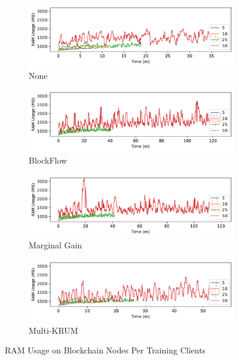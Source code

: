 \begin{figure}[!ht]
    \centering
    \begin{subfigure}[b]{0.49\textwidth}
        \centering
        \includegraphics[width=\textwidth]{graphics/clients/ram_none_miner.pdf}
        \caption{None}
    \end{subfigure}
    \hfill
    \begin{subfigure}[b]{0.49\textwidth}
        \centering
        \includegraphics[width=\textwidth]{graphics/clients/ram_blockflow_miner.pdf}
        \caption{BlockFlow}
    \end{subfigure}
    \hfill
    \begin{subfigure}[b]{0.49\textwidth}
        \centering
        \includegraphics[width=\textwidth]{graphics/clients/ram_marginalgain_miner.pdf}
        \caption{Marginal Gain}
    \end{subfigure}
    \hfill
    \begin{subfigure}[b]{0.49\textwidth}
        \centering
        \includegraphics[width=\textwidth]{graphics/clients/ram_multikrum_miner.pdf}
        \caption{Multi-KRUM}
    \end{subfigure}
    \caption{RAM Usage on Blockchain Nodes Per Training Clients}
    \label{fig:ram_clients_degree_miner}
\end{figure}






